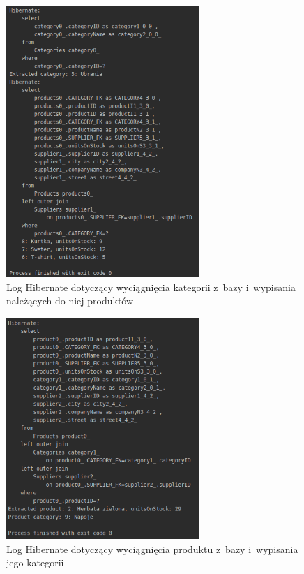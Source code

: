 \documentclass[12pt, a4paper]{mwart}
\begin{document}
\begin{figure}[ht]
  \centering
  \includegraphics[width=0.65\textwidth]{VIII/8-1.png}
  \caption{Log Hibernate dotyczący wyciągnięcia kategorii z~bazy i~wypisania należących do niej produktów}
  \label{rys:8.1}
\end{figure}

\begin{figure}[ht]
  \centering
  \includegraphics[width=0.65\textwidth]{VIII/8-2.png}
  \caption{Log Hibernate dotyczący wyciągnięcia produktu z~bazy i~wypisania jego kategorii}
  \label{rys:8.2}
\end{figure}
\end{document}

